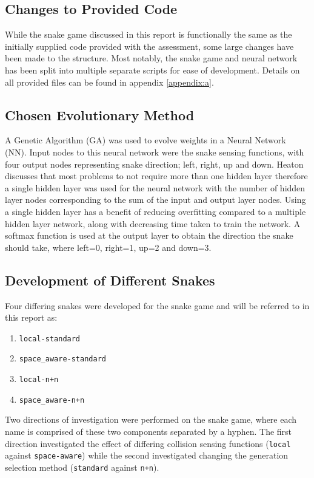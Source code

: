 \subsection{Changes to Provided Code}
While the snake game discussed in this report is functionally the same as the initially supplied code provided with the assessment, some large changes have been made to the structure. Most notably, the snake game and neural network has been split into multiple separate scripts for ease of development. Details on all provided files can be found in appendix \ref{appendix:a}.

\subsection{Chosen Evolutionary Method}
A Genetic Algorithm (GA) was used to evolve weights in a Neural Network (NN). Input nodes to this neural network were the snake sensing functions, with four output nodes representing snake direction; left, right, up and down. Heaton \cite{heaton} discusses that most problems to not require more than one hidden layer therefore a single hidden layer was used for the neural network with the number of hidden layer nodes corresponding to the sum of the input and output layer nodes. Using a single hidden layer has a benefit of reducing overfitting compared to a multiple hidden layer network, along with decreasing time taken to train the network. A softmax function is used at the output layer to obtain the direction the snake should take, where left=0, right=1, up=2 and down=3. 

\subsection{Development of Different Snakes}
Four differing snakes were developed for the snake game and will be referred to in this report as:
\begin{enumerate}[itemsep=-0.5em]
  \item \verb|local-standard|
  \item \verb|space_aware-standard|
  \item \verb|local-n+n|
  \item \verb|space_aware-n+n|
\end{enumerate}
Two directions of investigation were performed on the snake game, where each name is comprised of these two components separated by a hyphen. The first direction investigated the effect of differing collision sensing functions (\verb|local| against \verb|space-aware|) while the second investigated changing the generation selection method (\verb|standard| against \verb|n+n|).

